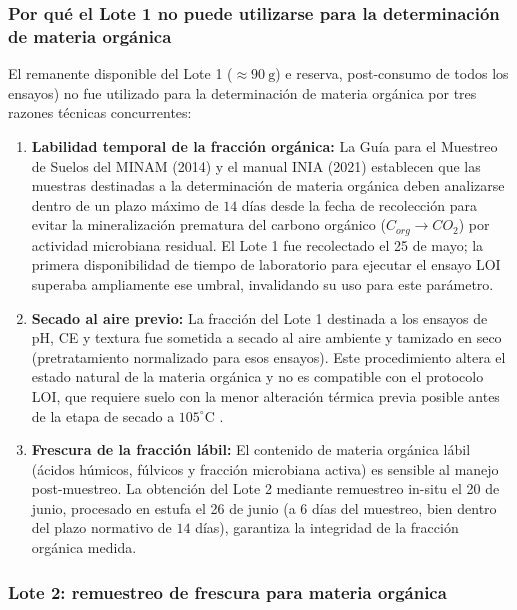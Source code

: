 \documentclass[fleqn]{jaes}
\begin{document}
\subsubsection{Por qué el Lote 1 no puede utilizarse para la determinación de materia orgánica}

El remanente disponible del Lote 1 ($\approx 90~\text{g}$) e reserva, post-consumo de todos los ensayos) no fue utilizado para la determinación de materia orgánica por tres razones técnicas concurrentes:

\begin{enumerate}
  \item \textbf{Labilidad temporal de la fracción orgánica:} La Guía para el Muestreo de Suelos del MINAM (2014) \cite{DireccinGeneraldeCalidadAmbiental2014} y el manual INIA (2021) \cite{InstitutoNacionaldeInnovacinAgrariaINIA2021} establecen que las muestras destinadas a la determinación de materia orgánica deben analizarse dentro de un plazo máximo de $14$ días desde la fecha de recolección para evitar la mineralización prematura del carbono orgánico ($C_{org} \rightarrow CO_2$) por actividad microbiana residual. El Lote 1 fue recolectado el 25 de mayo; la primera disponibilidad de tiempo de laboratorio para ejecutar el ensayo LOI superaba ampliamente ese umbral, invalidando su uso para este parámetro.

  \item \textbf{Secado al aire previo:} La fracción del Lote 1 destinada a los ensayos de pH, CE y textura fue sometida a secado al aire ambiente y tamizado en seco (pretratamiento normalizado para esos ensayos). Este procedimiento altera el estado natural de la materia orgánica y no es compatible con el protocolo LOI, que requiere suelo con la menor alteración térmica previa posible antes de la etapa de secado a $105^{\circ}\text{C}$ \cite{Hoogsteen2015}.

  \item \textbf{Frescura de la fracción lábil:} El contenido de materia orgánica lábil (ácidos húmicos, fúlvicos y fracción microbiana activa) es sensible al manejo post-muestreo. La obtención del Lote 2 mediante remuestreo in-situ el 20 de junio, procesado en estufa el 26 de junio (a $6$ días del muestreo, bien dentro del plazo normativo de $14$ días), garantiza la integridad de la fracción orgánica medida.
\end{enumerate}

\subsubsection{Lote 2: remuestreo de frescura para materia orgánica}\label{subsec:lote2}
\end{document}
